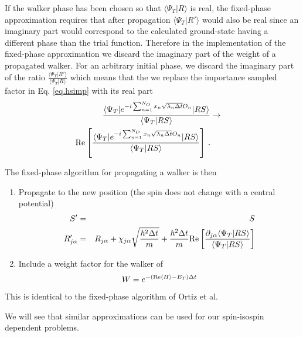 If the walker phase has been chosen so that $\langle \Psi_T|R\rangle$
is real, the fixed-phase approximation requires that after propagation
$\langle \Psi_T|R'\rangle$ would also be real since an imaginary
part would correspond to the calculated ground-state having a different
phase than the trial function. Therefore in the implementation of the
fixed-phase approximation
we discard the imaginary part of the weight of a propagated walker.
For an arbitrary initial phase, we discard the imaginary part of the
ratio $\frac{\langle \Psi_T|R'\rangle}{\langle \Psi_T|R\rangle}$ which
means that the we replace the importance sampled factor in
Eq. \ref{eq.hsimp} with its real part
\begin{eqnarray}
\frac{\langle \Psi_T |
e^{-i\sum_{n=1}^{N_O} x_n \sqrt{\lambda_n \Delta t} O_n}|R S\rangle}
{\langle \Psi_T|RS\rangle}
&\rightarrow&
\nonumber\\
{\rm Re} \left [ \frac{\langle \Psi_T |
e^{-i\sum_{n=1}^{N_O} x_n \sqrt{\lambda_n \Delta t} O_n}|R S\rangle}
{\langle \Psi_T|RS\rangle} \right ] \,.
\end{eqnarray}

The fixed-phase algorithm for propagating a walker is then
\begin{enumerate}
\item
Propagate to the new position (the spin does not change with a central
potential)
\begin{eqnarray}
S' &=& S
\nonumber\\
R'_{j\alpha} &=&
R_{j\alpha}+ \chi_{j\alpha} \sqrt{\frac{\hbar^2 \Delta t}{m}}
+
\frac{\hbar^2 \Delta t}{m}
{\rm Re} \left [ \frac{\partial_{j\alpha} \langle \Psi_T |RS\rangle}
{\langle \Psi_T |RS\rangle} \right ]
\nonumber\\
\end{eqnarray}
\item
Include a weight factor for the walker of
\begin{equation}
W = e^{ -({\rm Re} \langle H\rangle -E_T)\Delta t}
\end{equation}
\end{enumerate}
This is identical to the fixed-phase algorithm of Ortiz et al.

We will see that similar approximations can be used for our spin-isospin
dependent problems.

